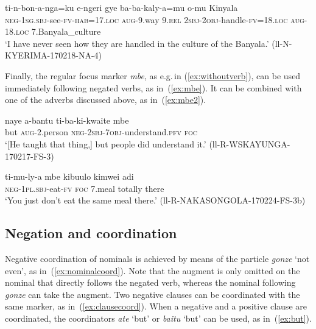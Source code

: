 \documentclass[output=paper,colorlinks,citecolor=brown,draftmode]{langscibook}
\begin{document}
    \ex \label{ex:enclitic1.b}%
    \gll	        ti-n-bon-a-nga=ku e-ngeri gye ba-ba-kaly-a=mu o-mu Kinyala\\ 
    	    	\textsc{neg}-1\textsc{sg.sbj}-see-\textsc{fv}-\textsc{hab}=\textsc{17.loc} \textsc{aug}-9.way \textsc{9.rel} \textsc{2sbj}-\textsc{2obj}-handle-\textsc{fv}=\textsc{18.loc} \textsc{aug}-\textsc{18.loc} 7.Banyala\_culture\\
    	\glt ‘I have never seen how they are handled in the culture of the Banyala.’ (ll-N-KYERIMA-170218-NA-4)
    \z 
\z

Finally, the regular focus marker \textit{mbe}, as e.g.\,in (\ref{ex:withoutverb}), can be used immediately following negated verbs, as in~(\ref{ex:mbe}). 
It can be combined with one of the adverbs discussed above, as in~(\ref{ex:mbe2}).

\ea \label{ex:mbe}
\begin{xlist}
\ex \label{ex:mbe1}
\gll	        naye a-bantu ti-ba-ki-kwaite mbe\\
	    	but \textsc{aug}-2.person \textsc{neg}-\textsc{2sbj}-\textsc{7obj}-understand.\textsc{pfv} \textsc{foc} \\
	\glt ‘[He taught that thing,] but people did understand it.’ (ll-R-WSKAYUNGA-170217-FS-3)
	
\ex \label{ex:mbe2}
	       \gll ti-mu-ly-a mbe kibuulo kimwei adi\\
		    \textsc{neg}-1\textsc{pl.sbj}-eat-\textsc{fv} \textsc{foc} 7.meal totally there\\
	\glt ‘You just don't eat the same meal there.' (ll-R-NAKASONGOLA-170224-FS-3b)
\end{xlist}
\z

\subsection{Negation and coordination}
\label{sec:complexruuli}

Negative coordination of nominals is achieved by means of the particle \textit{gonze} `not even', as in~(\ref{ex:nominalcoord}). 
Note that the augment is only omitted on the nominal that directly follows the negated verb, whereas the nominal following \textit{gonze} can take the augment. 
Two negative clauses can be coordinated with the same marker, as in~(\ref{ex:clausecoord}). 
When a negative and a positive clause are coordinated, the coordinators \textit{ate} `but' or \textit{baitu} `but' can be used, as in~(\ref{ex:but}). 
\end{document}

